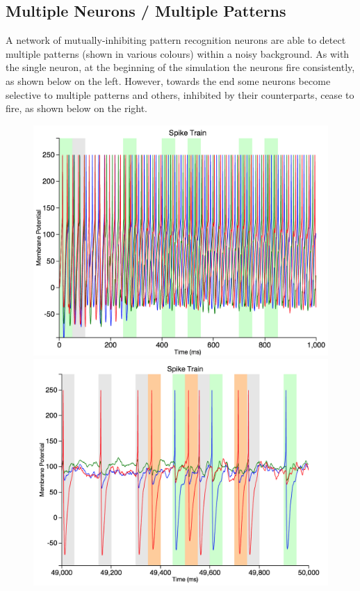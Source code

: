 \documentclass[a4paper,11pt]{article}
\begin{document}
\begin{appendices}
\newpage

\subsection{Multiple Neurons / Multiple Patterns}
A network of mutually-inhibiting pattern recognition neurons are able to detect multiple patterns (shown in various colours) within a noisy background. As with the single neuron, at the beginning of the simulation the neurons fire consistently, as shown below on the left. However, towards the end some neurons become selective to multiple patterns and others, inhibited by their counterparts, cease to fire, as shown below on the right.

\begin{figure}[h]
\centering
\includegraphics[scale = 0.3]{multiple_beginning}
\includegraphics[scale = 0.3]{multiple_end}
\end{figure}


\end{appendices}
\end{document}

